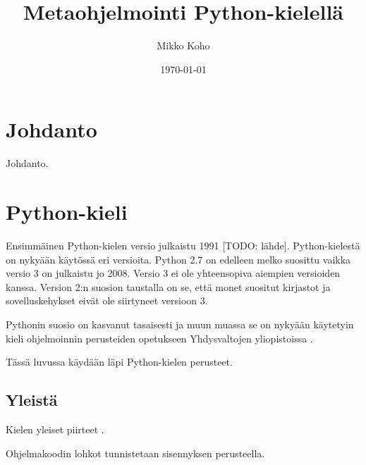 \documentclass[finnish]{tktltiki2}
\title{Metaohjelmointi Python-kielellä}
\author{Mikko Koho}
\date{\today}
\theoremstyle{definition}
\theoremstyle{remark}
\begin{document}
    

\frontmatter      %

\maketitle        %

\makeabstract     %

\tableofcontents  %


\mainmatter       %


\section{Johdanto}

Johdanto.

\section{Python-kieli}


Ensimmäinen Python-kielen versio julkaistu 1991 [TODO: lähde]. Python-kielestä on nykyään käytössä eri versioita. Python 2.7 on edelleen melko suosittu vaikka versio 3 on julkaistu jo 2008. Versio 3 ei ole yhteensopiva aiempien versioiden kanssa. Version 2:n suosion taustalla on se, että monet suositut kirjastot ja sovelluskehykset eivät ole siirtyneet versioon 3.

Pythonin suosio on kasvanut tasaisesti ja muun muassa se on nykyään käytetyin kieli ohjelmoinnin perusteiden opetukseen Yhdysvaltojen yliopistoissa \cite{python-teaching}.

Tässä luvussa käydään läpi Python-kielen perusteet.

\subsection{Yleistä}

Kielen yleiset piirteet \cite{martelli2006python}.

Ohjelmakoodin lohkot tunnistetaan sisennyksen perusteella.
\end{document}
